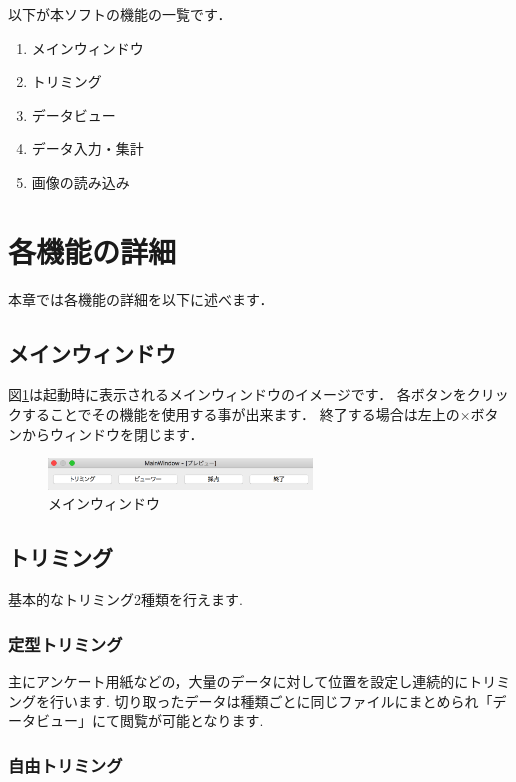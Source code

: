 \documentclass[12pt]{jsreport}
\begin{document}
以下が本ソフトの機能の一覧です．
\begin{enumerate}
    \item メインウィンドウ
    \item トリミング
    \item データビュー
    \item データ入力・集計
    \item 画像の読み込み
\end{enumerate}

\newpage

\section{各機能の詳細}
本章では各機能の詳細を以下に述べます．

\subsection{メインウィンドウ}
図\ref{fig:MainWindow}は起動時に表示されるメインウィンドウのイメージです．
各ボタンをクリックすることでその機能を使用する事が出来ます．
終了する場合は左上の×ボタンからウィンドウを閉じます．
\begin{figure}[htbp]
  \centering
 \begin{minipage}{1\hsize}
  \begin{center}
   \includegraphics[width=70mm]{MainWindow.png}
  \end{center}
  \caption{メインウィンドウ}
  \label{fig:MainWindow}
 \end{minipage}
\end{figure}

\subsection{トリミング}
基本的なトリミング2種類を行えます.

\subsubsection{定型トリミング}

    主にアンケート用紙などの，大量のデータに対して位置を設定し連続的にトリミングを行います.
    切り取ったデータは種類ごとに同じファイルにまとめられ「データビュー」にて閲覧が可能となります.

\subsubsection{自由トリミング}
\end{document}
